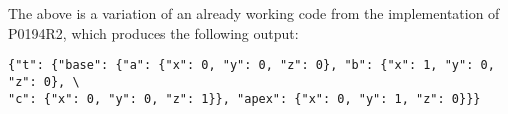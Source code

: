 The above is a variation of an already working code from the implementation
of P0194R2, which produces the following output:

\begin{verbatim}
{"t": {"base": {"a": {"x": 0, "y": 0, "z": 0}, "b": {"x": 1, "y": 0, "z": 0}, \
"c": {"x": 0, "y": 0, "z": 1}}, "apex": {"x": 0, "y": 1, "z": 0}}}
\end{verbatim}

